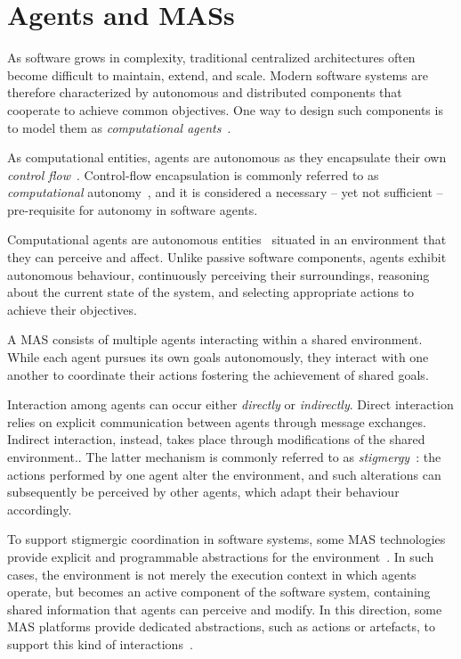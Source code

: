 \section{Agents and \aclp{MAS}}
\label{sec:agents-mas}

As software grows in complexity, 
traditional centralized architectures often become difficult 
to maintain, extend, and scale. 
%
Modern software systems are therefore characterized by autonomous and distributed components 
that cooperate to achieve common objectives. 
%
One way to design such components is to model them as \emph{computational agents}~\cite{WooldridgeJ99}.

As computational entities, agents are autonomous as they encapsulate their own \emph{control flow}~\cite{objag-jot1}.
%
Control-flow encapsulation is commonly referred to as \emph{computational} autonomy~\cite{artifacts-jaamas17},
and it is considered a necessary -- yet not sufficient -- pre-requisite for autonomy in software agents.

Computational agents are autonomous entities~\cite{OmiciniRV08}
situated in an environment that they can perceive and affect.
%
Unlike passive software components, 
agents exhibit autonomous behaviour,
continuously perceiving their surroundings, 
reasoning about the current state of the system, 
and selecting appropriate actions to achieve their objectives.

A \ac{MAS} consists of multiple agents interacting within a shared environment.
%
While each agent pursues its own goals autonomously, 
they interact with one another to 
coordinate their actions fostering the achievement of shared goals.

Interaction among agents can occur either \emph{directly} or \emph{indirectly}.
%
Direct interaction relies on explicit communication between agents through message exchanges.
%
Indirect interaction, instead, takes place through modifications of the shared environment..
%
The latter mechanism is commonly referred to as \emph{stigmergy}~\cite{ch30-castelfranchifestschrift2012,HadeliVKB04}:
the actions performed by one agent alter the environment, and such alterations can subsequently be perceived by other agents, which adapt their behaviour accordingly.

To support stigmergic coordination in software systems,
some \ac{MAS} technologies provide explicit and programmable abstractions for the environment~\cite{weyns2007aamas}.
%
In such cases,
the environment is not merely the execution context in which agents operate, 
but becomes an active component of the software system, 
containing shared information that agents can perceive and modify.
%
In this direction, 
some \ac{MAS} platforms provide dedicated abstractions, 
such as actions or artefacts, 
to support this kind of interactions~\cite{OmiciniRVCT04}.

